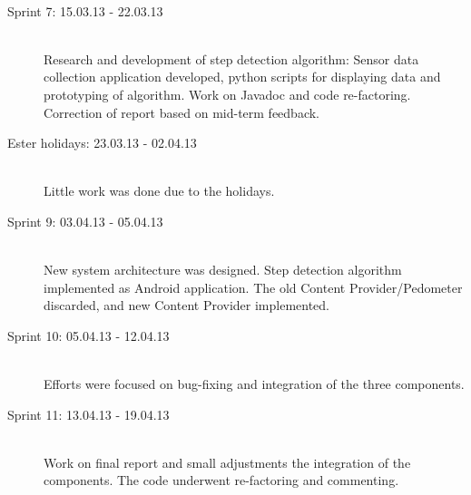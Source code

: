 \begin{description}
 \\ \noindent\makebox[\linewidth]{\rule{\textwidth}{1pt}}
  \item[Sprint 7: 15.03.13 - 22.03.13]    \hfill \\
Research and development of step detection algorithm: Sensor data collection application developed, python scripts for displaying data and prototyping of algorithm. Work on Javadoc and code re-factoring. Correction of report based on mid-term feedback.
 \\ \noindent\makebox[\linewidth]{\rule{\textwidth}{1pt}}
  \item[Ester holidays: 23.03.13 - 02.04.13]    \hfill \\
Little work was done due to the holidays.
 \\ \noindent\makebox[\linewidth]{\rule{\textwidth}{1pt}} 
 \item[Sprint 9: 03.04.13 - 05.04.13]    \hfill \\
New system architecture was designed. Step detection algorithm implemented as Android application. The old Content Provider/Pedometer discarded, and new Content Provider implemented. 
 \\ \noindent\makebox[\linewidth]{\rule{\textwidth}{1pt}} 
 \item[Sprint 10: 05.04.13 - 12.04.13]    \hfill \\
Efforts were focused on bug-fixing and integration of the three components. 
 \\ \noindent\makebox[\linewidth]{\rule{\textwidth}{1pt}}
  \item[Sprint 11: 13.04.13 - 19.04.13]    \hfill \\
Work on final report and small adjustments the integration of the components. The code underwent re-factoring and commenting. 
\end{description}